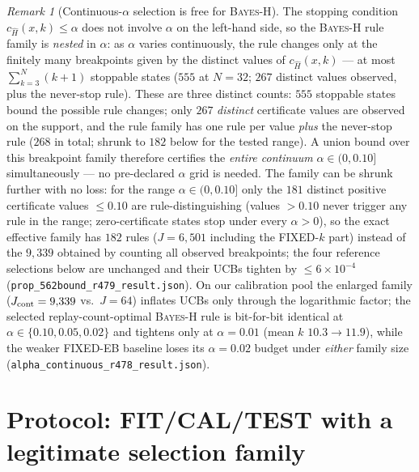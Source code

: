 \documentclass{article}
\theoremstyle{definition}
\theoremstyle{remark}
\newtheorem{remark}{Remark}
\begin{document}
\begin{remark}[Continuous-$\alpha$ selection is free for \textsc{Bayes-H}]
\label{rem:nested}
The stopping condition $c_{\widehat H}(x,k)\le\alpha$ does not involve
$\alpha$ on the left-hand side, so the \textsc{Bayes-H} rule family is
\emph{nested} in $\alpha$: as $\alpha$ varies continuously, the rule changes
only at the finitely many breakpoints given by the distinct values of
$c_{\widehat H}(x,k)$ --- at most $\sum_{k=3}^{N}(k+1)$ stoppable states
($555$ at $N{=}32$; $267$ distinct values observed, plus the never-stop
rule). These are three distinct counts: $555$ stoppable states bound the
possible rule changes; only $267$ \emph{distinct} certificate values are
observed on the support, and the rule family has one rule per value
\emph{plus} the never-stop rule ($268$ in total; shrunk to $182$ below
for the tested range). A union bound over this breakpoint family
therefore
certifies the \emph{entire continuum} $\alpha\in(0,0.10]$
simultaneously --- no pre-declared $\alpha$ grid is needed. The family can
be shrunk further with no loss: for the range $\alpha\in(0,0.10]$ only the
$181$ distinct positive certificate values ${\le}0.10$ are
rule-distinguishing (values $>0.10$ never trigger any rule in the range;
zero-certificate states stop under every $\alpha>0$), so the exact
effective family has $182$ rules ($J=6{,}501$ including the FIXED-$k$ part)
instead of the $9{,}339$ obtained by counting all observed breakpoints; the
four reference selections below are unchanged and their UCBs tighten by
${\le}6\times10^{-4}$ (\texttt{prop\_562bound\_r479\_result.json}). On our
calibration pool the enlarged family
($J_{\rm cont}=9{,}339$ vs.\ $J=64$) inflates UCBs only through the
logarithmic factor; the selected replay-count-optimal \textsc{Bayes-H} rule is
bit-for-bit identical at $\alpha\in\{0.10,0.05,0.02\}$ and tightens only at
$\alpha=0.01$ (mean $k$ $10.3\!\to\!11.9$), while the weaker FIXED-EB
baseline loses its $\alpha=0.02$ budget under \emph{either} family size
(\texttt{alpha\_continuous\_r478\_result.json}).
\end{remark}

\section{Protocol: FIT/CAL/TEST with a legitimate selection family}
\label{sec:protocol}
\end{document}
